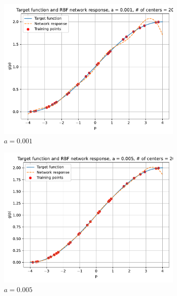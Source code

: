 \begin{figure}[htbp]
	\centering
	\begin{subfigure}{0.33\linewidth}
		\centering
		\includegraphics[width=\linewidth]{../Problem 2/prob2_response_a_0.001_Cnum_20.pdf}
		\caption{$a=0.001$}
	\end{subfigure}\hfill
	\begin{subfigure}{0.33\linewidth}
		\centering
		\includegraphics[width=\linewidth]{../Problem 2/prob2_response_a_0.005_Cnum_20.pdf}
		\caption{$a=0.005$}
	\end{subfigure}\hfill
	\begin{subfigure}{0.33\linewidth}
		\centering

\end{subfigure}
\end{figure}
